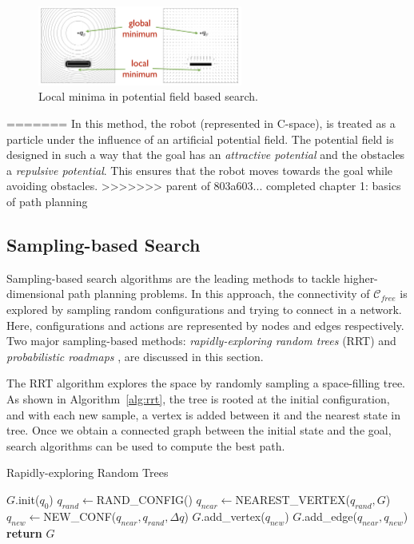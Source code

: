\begin{figure}
\centering
\includegraphics[width=0.6\textwidth]{./images/potential_search}
\caption{Local minima in potential field based search. \cite{siciliano2010robotics}}
\label{fig:potential_search}
\end{figure}

=======
In this method, the robot (represented in C-space), is treated as a particle under the influence of an artificial potential field. The potential field is designed in such a way that the goal has an \textit{attractive potential} and the obstacles a \textit{repulsive potential}. This ensures that the robot moves towards the goal while avoiding obstacles. 
>>>>>>> parent of 803a603... completed chapter 1: basics of path planning

\subsection{Sampling-based Search}
Sampling-based search algorithms are the leading methods to tackle higher-dimensional path planning problems. In this approach, the connectivity of $\mathcal{C}_{free}$ is explored by sampling random configurations and trying to connect in a network. Here, configurations and actions are represented by nodes and edges respectively. Two major sampling-based methods: \textit{rapidly-exploring random trees} (RRT) \cite{lavalle2006planning} and \textit{probabilistic roadmaps} \cite{kavraki1994probabilistic}, are discussed in this section.

The RRT algorithm explores the space by randomly sampling a space-filling tree. As shown in Algorithm~\ref{alg:rrt}, the tree is rooted at the initial configuration, and with each new sample, a vertex is added between it and the nearest state in tree. Once we obtain a connected graph between the initial state and the goal, search algorithms can be used to compute the best path. 

\begin{algorithm}
\caption{Rapidly-exploring Random Trees}\label{alg:rrt}
\begin{algorithmic}[1]
\State $G$.init($q_0$)
\State $q_{rand}\gets$RAND\_CONFIG()
\State $q_{near}\gets$NEAREST\_VERTEX($q_{rand},G$)
\State $q_{new}\gets$NEW\_CONF($q_{near}, q_{rand}, \Delta q$)
\State $G$.add\_vertex($q_{new}$)
\State $G$.add\_edge($q_{near},q_{new}$)
\EndFor
\State \textbf{return} $G$
\end{algorithmic}
\end{algorithm}

